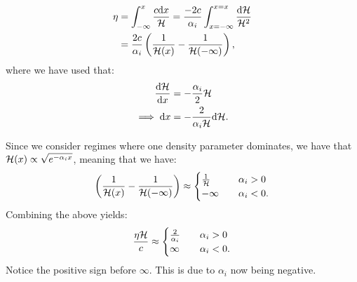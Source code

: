     \begin{equation}
        \begin{split}
            \eta &= \int_{-\infty}^x \frac{c\mathrm{d} x}{\mathcal{H}} = \frac{-2c}{\alpha_i}\int_{x=-\infty}^{x=x}\frac{\mathrm{d}\mathcal{H}}{\mathcal{H}^2} \\
            &= \frac{2c}{\alpha_i}\left(\frac{1}{\mathcal{H}(x)}-\frac{1}{\mathcal{H}(-\infty)}\right),
        \end{split}
    \end{equation}
    where we have used that:
    \begin{equation}
        \begin{split}
            \dv{\mathcal{H}}{x} &= -\frac{\alpha_i}{2}\mathcal{H} \\
            \implies \mathrm{d} x &= -\frac{2}{\alpha_i\mathcal{H}}\mathrm{d}\mathcal{H}.
        \end{split}
    \end{equation}
    
    Since we consider regimes where one density parameter dominates, we have that $\mathcal{H}(x)\propto \sqrt{e^{-\alpha_ix}}$, meaning that we have:
    \begin{equation}
        \left(\frac{1}{\mathcal{H}(x)}-\frac{1}{\mathcal{H}(-\infty)}\right) \approx 
        \begin{cases}
            \frac{1}{\mathcal{H}} \quad &\alpha_i>0 \\
            -\infty \quad &\alpha_i <0.
        \end{cases}
    \end{equation}
    Combining the above yields:
    \begin{equation}
        \frac{\eta\mathcal{H}}{c} \approx 
        \begin{cases}
            \frac{2}{\alpha_i} \quad &\alpha_i>0 \\
            \infty \quad &\alpha_i<0.
        \end{cases}
    \end{equation}
    Notice the positive sign before $\infty$. This is due to $\alpha_i$ now being negative. 
    
